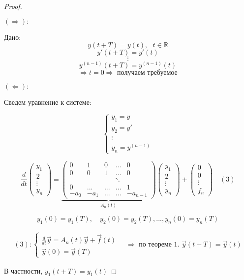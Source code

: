 \documentclass[12pt, a4paper]{report}
\begin{document}
\begin{proof} \(  \) 
\begin{flushleft}
    \( (\Rightarrow): \) 
\end{flushleft}

Дано:  
\[  y(t+T )= y(t ) , \text{ }  t \in \mathbb{R}  \] 
\[ y'(t+T ) = y' (t) \]  
\[ \vdots \] 
\[ y^{(n-1 )} (t+T ) = y^{(n-1 )}  (t) \] 
\[ \Rightarrow t =0 \Rightarrow \text{ получаем требуемое}  \] 

\begin{flushleft}
    \( (\Leftarrow): \) 
\end{flushleft}

Сведем уравнение к системе: 

\[ \begin{cases}
y_1 = y \\ 
y_2 = y' \\ 
\vdots \\ 
y_n = y^{(n-1)} 
\end{cases} \]

\[ \frac{d}{dt} \begin{pmatrix}
y_1 \\
2\\
\vdots\\
y_n
\end{pmatrix} = \underbrace{\begin{pmatrix}
    0 & 1 & 0 & ... & 0\\
    0 & 0 & 1 & ... & 0\\
    &  &  & \ddots & \\
    0 & ... & ... & ... & 1\\
    -a_0  & -a_1  & ... & ... & -a_{n-1} 
    \end{pmatrix}}_{A_n(t)}\begin{pmatrix}
    y_1 \\
    2\\
    \vdots\\
    y_n
\end{pmatrix} + \begin{pmatrix}
    0 \\
    0\\
    \vdots\\
    f_n
\end{pmatrix} \quad (3) \] 

\[ y_1 (0 )= y_1 (T  ) ,\quad  y_2 (0 ) =y_2 (T ) ,..., y_n (0 ) = y_n (T) \] 

\[ \begin{aligned}
    (3):\begin{cases}
        \displaystyle  \frac{d}{dt } \vec{y }  = A_n (t )\vec{y } + \vec{f } (t ) \\ 
        \vec{y } (0 ) = \vec{y } (T)
    \end{cases}
    \quad \Rightarrow \text{ по теореме 1. }  \vec{y } (t +T ) = \vec{y } (t )
\end{aligned} \] 

В частности, \( y_1 (t +T ) = y_1 (t ) \) 



\end{proof}
\end{document}
